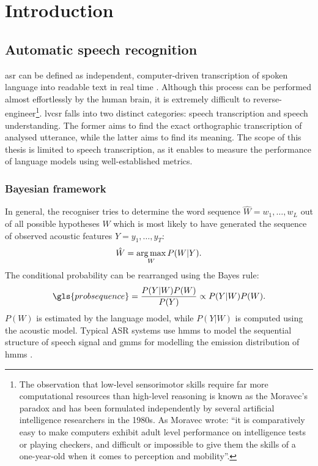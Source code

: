 \chapter{Introduction}
\label{chapter:intro}

\section{Automatic speech recognition}
\label{section:asr}
\Gls{asr} can be defined as independent, computer-driven transcription of spoken language into readable text in real time \cite{stuckless1994developments, jelinek1997statistical}. Although this process can be performed almost effortlessly by the human brain, it is extremely difficult to reverse-engineer\footnote{The observation that low-level sensorimotor skills require far more computational resources than high-level reasoning is known as the Moravec's paradox and has been formulated independently by several artificial intelligence researchers in the 1980s. As Moravec wrote: ``it is comparatively easy to make computers exhibit adult level performance on intelligence tests or playing checkers, and difficult or impossible to give them the skills of a one-year-old when it comes to perception and mobility''\cite{moravec1988mind}.}. \Gls{lvcsr} falls into two distinct categories: speech transcription and speech understanding. The former aims to find the exact orthographic transcription of analysed utterance, while the latter aims to find its meaning. The scope of this thesis is limited to speech transcription, as it enables to measure the performance of language models using well-established metrics.

\subsection{Bayesian framework}
\label{subsection:bayesian}
In general, the recogniser tries to determine the word sequence $\hat{W}=w_{1}, \ldots, w_{L}$ out of all possible hypotheses $W$ which is most likely to have generated the sequence of observed acoustic features $Y=y_{1}, \ldots, y_{T}$:
\begin{equation}
\label{equation:recogniser}
  \hat{W}=\operatorname*{arg\, max}_{W}P(W|Y).
\end{equation}
The conditional probability can be rearranged using the Bayes rule:
\begin{equation}
  \label{equation:bayesian}
  \gls{probsequence}=\frac{P(Y|W)P(W)}{P(Y)}\propto{P(Y|W)P(W)}.
\end{equation}
$P(W)$ is estimated by the language model, while $P(Y|W)$ is computed using the acoustic model. Typical ASR systems use \glspl{hmm} to model the sequential structure of speech signal and \glspl{gmm} for modelling the emission distribution of \glspl{hmm} \cite{baker1975dragon, bourlard1994connectionist}.


